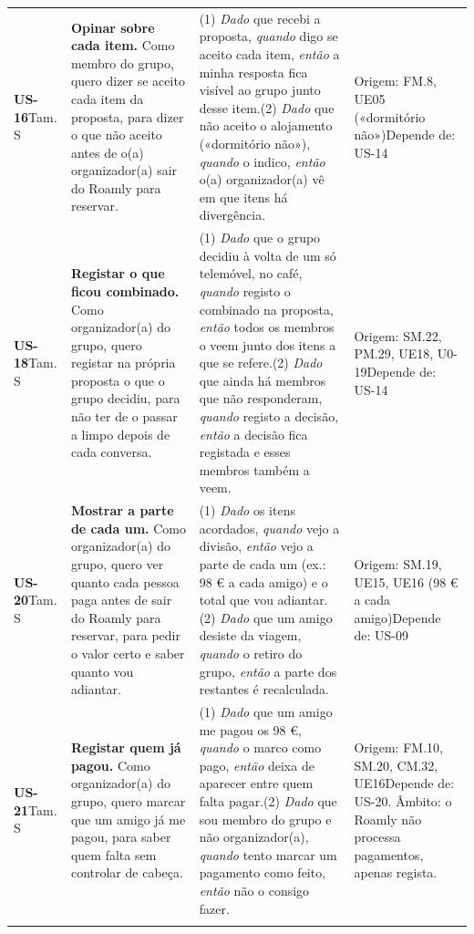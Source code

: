 {\begin{longtable}{@{}p{1.5cm}p{5.1cm}p{5.2cm}p{3.6cm}@{}}
\textbf{US-16}\newline Tam. S & \textbf{Opinar sobre cada item.} Como membro do grupo, quero dizer se aceito cada item da proposta, para dizer o que não aceito antes de o(a) organizador(a) sair do Roamly para reservar. & (1) \textit{Dado} que recebi a proposta, \textit{quando} digo se aceito cada item, \textit{então} a minha resposta fica visível ao grupo junto desse item.\newline (2) \textit{Dado} que não aceito o alojamento («dormitório não»), \textit{quando} o indico, \textit{então} o(a) organizador(a) vê em que itens há divergência. & Origem: FM.8, UE05 («dormitório não»)\newline Depende de: US-14 \\ \addlinespace
\textbf{US-18}\newline Tam. S & \textbf{Registar o que ficou combinado.} Como organizador(a) do grupo, quero registar na própria proposta o que o grupo decidiu, para não ter de o passar a limpo depois de cada conversa. & (1) \textit{Dado} que o grupo decidiu à volta de um só telemóvel, no café, \textit{quando} registo o combinado na proposta, \textit{então} todos os membros o veem junto dos itens a que se refere.\newline (2) \textit{Dado} que ainda há membros que não responderam, \textit{quando} registo a decisão, \textit{então} a decisão fica registada e esses membros também a veem. & Origem: SM.22, PM.29, UE18, U0-19\newline Depende de: US-14 \\ \addlinespace
\textbf{US-20}\newline Tam. S & \textbf{Mostrar a parte de cada um.} Como organizador(a) do grupo, quero ver quanto cada pessoa paga antes de sair do Roamly para reservar, para pedir o valor certo e saber quanto vou adiantar. & (1) \textit{Dado} os itens acordados, \textit{quando} vejo a divisão, \textit{então} vejo a parte de cada um (ex.: 98 € a cada amigo) e o total que vou adiantar.\newline (2) \textit{Dado} que um amigo desiste da viagem, \textit{quando} o retiro do grupo, \textit{então} a parte dos restantes é recalculada. & Origem: SM.19, UE15, UE16 (98 € a cada amigo)\newline Depende de: US-09 \\ \addlinespace
\textbf{US-21}\newline Tam. S & \textbf{Registar quem já pagou.} Como organizador(a) do grupo, quero marcar que um amigo já me pagou, para saber quem falta sem controlar de cabeça. & (1) \textit{Dado} que um amigo me pagou os 98 €, \textit{quando} o marco como pago, \textit{então} deixa de aparecer entre quem falta pagar.\newline (2) \textit{Dado} que sou membro do grupo e não organizador(a), \textit{quando} tento marcar um pagamento como feito, \textit{então} não o consigo fazer. & Origem: FM.10, SM.20, CM.32, UE16\newline Depende de: US-20. Âmbito: o Roamly não processa pagamentos, apenas regista. \\ \addlinespace

\end{longtable}}
